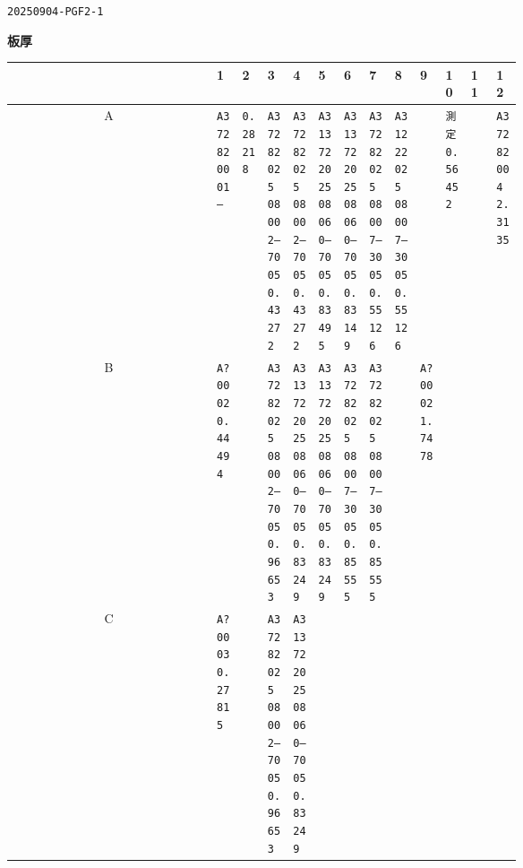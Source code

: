 \documentclass[UTF8,10pt,a4paper,fontset=fandol]{ctexart}
\begin{document}
\newpage

\noindent\texttt{20250904-PGF2-1}\hfill {}

\noindent\textbf{板厚}

\begin{center}
\scriptsize
\begin{tabular}{c|*{12}{p{0.055\linewidth}|}}
 & 1 & 2 & 3 & 4 & 5 & 6 & 7 & 8 & 9 & 10 & 11 & 12\\ \hline
A &
\texttt{A372820001\\--} &
\texttt{0.28218} &
\texttt{A37282025\\08002--7005\\0.43272} &
\texttt{A37282025\\08002--7005\\0.43272} &
\texttt{A313722025\\08060--7005\\0.83495} &
\texttt{A313722025\\08060--7005\\0.83149} &
\texttt{A37282025\\08007--3005\\0.55126} &
\texttt{A31222025\\08007--3005\\0.55126} &
 &
\texttt{測定\\0.56452} &
 &
\texttt{A37282004\\2.3135}
\\ \hline
B &
\texttt{A?0002\\0.44494} &
 &
\texttt{A37282025\\08002--7005\\0.96653} &
\texttt{A313722025\\08060--7005\\0.83249} &
\texttt{A313722025\\08060--7005\\0.83249} &
\texttt{A37282025\\08007--3005\\0.85555} &
\texttt{A37282025\\08007--3005\\0.85555} &
 &
\texttt{A?0002\\1.7478} &
 &
 &
\\ \hline
C &
\texttt{A?0003\\0.27815} &
 &
\texttt{A37282025\\08002--7005\\0.96653} &
\texttt{A313722025\\08060--7005\\0.83249} &

\end{tabular}
\end{center}
\end{document}
